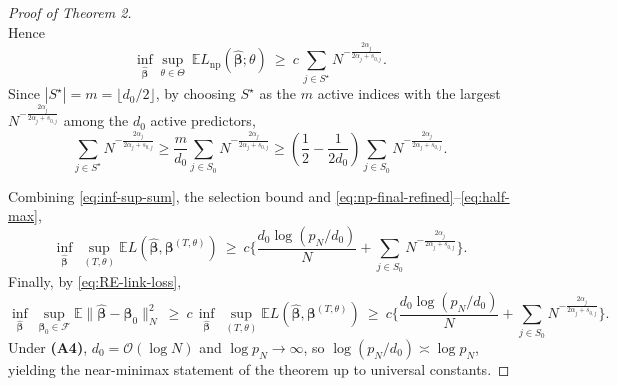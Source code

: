 \documentclass[11pt]{article}
\newcommand{\E}{\mathbb{E}} %
\theoremstyle{plain}
\theoremstyle{definition}
\theoremstyle{plain}
\begin{document}
\begin{proof}[Proof of Theorem 2]
\[\]
Hence
\begin{equation}\label{eq:np-final-refined}
\inf_{\widehat{\bm\beta}} \sup_{\theta\in\Theta}\ \E L_{\mathrm{np}}(\widehat{\bm\beta};\theta)
\ \ge\ c\,\sum_{j\in S^\star} N^{-\frac{2\alpha_{j}}{2\alpha_{j}+s_{0,j}}}.
\end{equation}
Since $|S^\star|=m=\lfloor d_0/2\rfloor$, by choosing $S^\star$ as the $m$ active indices with the largest
$N^{-\frac{2\alpha_{j}}{2\alpha_{j}+s_{0,j}}}$ among the $d_0$ active predictors,
\begin{equation}\label{eq:half-max} \sum_{j\in S^\star} N^{-\frac{2\alpha_{j}}{2\alpha_{j}+s_{0,j}}} \ge \frac{m}{d_0} \sum_{j \in S_0} N^{-\frac{2 \alpha_j}{2 \alpha_j + s_{0,j}}} \ge \left(\frac{1}{2}-\frac{1}{2 d_0} \right)\sum_{j\in S_0} N^{-\frac{2\alpha_{j}}{2\alpha_{j}+s_{0,j}}}.
\end{equation}

Combining \eqref{eq:inf-sup-sum}, the selection bound and \eqref{eq:np-final-refined}–\eqref{eq:half-max},
\[
\inf_{\widehat{\bm\beta}}\ \sup_{(T,\theta)} \E L(\widehat{\bm\beta},\bm\beta^{(T,\theta)})
\ \ge\ c\Bigg\{\frac{d_0\log(p_N/d_0)}{N}
+\sum_{j\in S_0} N^{-\frac{2\alpha_{j}}{2\alpha_{j}+s_{0,j}}}\Bigg\}.
\]
Finally, by \eqref{eq:RE-link-loss},
\[
\inf_{\widehat{\bm\beta}}\ \sup_{\bm\beta_0\in\mathcal F}
\E\big\|\widehat{\bm\beta}-\bm\beta_0\big\|_N^{2}
\ \ge\ c\,\inf_{\widehat{\bm\beta}}\ \sup_{(T,\theta)} \E L(\widehat{\bm\beta},\bm\beta^{(T,\theta)})
\ \ge\
c\Bigg\{\frac{d_0\log(p_N/d_0)}{N}
+\sum_{j\in S_0} N^{-\frac{2\alpha_{j}}{2\alpha_{j}+s_{0,j}}}\Bigg\}.
\]
Under {\textbf{(A4)}}, $d_0=\mathcal{O}(\log N)$ and $\log p_N\to\infty$, so $\log(p_N/d_0)\asymp \log p_N$, yielding the near-minimax statement of the theorem up to universal constants.
\end{proof}
\end{document}
